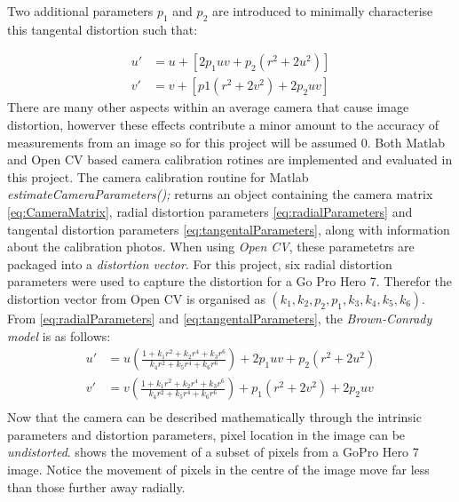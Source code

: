 \documentclass{UoNMCHA}
\numberwithin{equation}{section}
\begin{document}
Two additional parameters $p_{1}$ and $p_{2}$ are introduced to minimally characterise this tangental distortion such that:

\begin{equation}\label{eq:tangentalParameters}
	\begin{split}
		u' &= u + [2p_{1}uv + p_{2}(r^{2} + 2u^{2})]\\
		v' &= v  + [p1(r^{2} + 2v^2) + 2p_{2}uv]
	\end{split}
\end{equation}
There are many other aspects within an average camera that cause image distortion, howerver these effects contribute a minor amount to the accuracy of measurements from an image so for this project will be assumed $0$. Both Matlab and Open CV based camera calibration rotines are implemented and evaluated in this project. The camera calibration routine for Matlab \textit{estimateCameraParameters();} returns an object containing the camera matrix \ref{eq:CameraMatrix}, radial distortion parameters \ref{eq:radialParameters} and tangental distortion parameters \ref{eq:tangentalParameters}, along with information about the calibration photos. When using \textit{Open CV}, these parametetrs are packaged into a \textit{distortion vector}. For this project, six radial distortion parameters were used to capture the distortion for a Go Pro Hero 7. Therefor the distortion vector from Open CV is organised as $(k_{1}, k_{2}, p_{2}, p_{1}, k_{3}, k_{4}, k_{5}, k_{6})$.
From \cref{eq:radialParameters} and \cref{eq:tangentalParameters}, the \textit{Brown-Conrady model} is as follows:
\begin{equation}\label{eq:BrownConradymodel}
	\begin{split}
		u' &= u\left(\frac{1  +k_{1}r^{2} + k_{2}r^{4} + k_{3}r^{6}}{k_{4}r^{2} + k_{5}r^{4} + k_{6}r^{6}}\right) + 2p_{1}uv + p_{2}(r^{2} + 2u^{2})\\
		v' &= v\left(\frac{1  +k_{1}r^{2} + k_{2}r^{4} + k_{3}r^{6}}{k_{4}r^{2} + k_{5}r^{4} + k_{6}r^{6}}\right)  + p_{1}(r^{2} + 2v^{2}) + 2p_{2}uv\\
	\end{split}
\end{equation}
Now that the camera can be described mathematically through the intrinsic parameters and distortion parameters, pixel location in the image can be \textit{undistorted}.  shows the movement of a subset of pixels from a GoPro Hero 7 image. Notice the movement of pixels in the centre of the image move far less than those further away radially.
\end{document}
